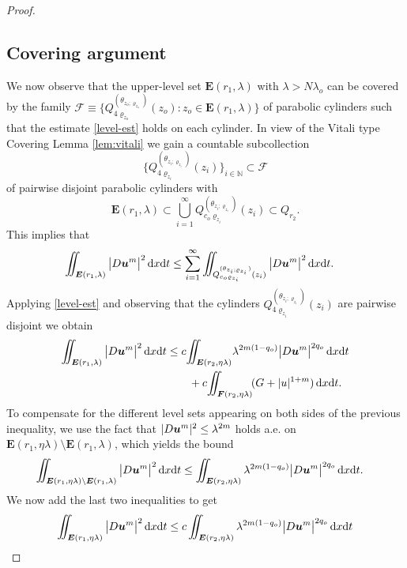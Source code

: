 \documentclass[a4paper, 10pt, american]{amsart}
\numberwithin{theorem}{section}
\numberwithin{equation}{section}
\def\N{\mathbb{N}}
\newcommand{\dxdt}{\,\mathrm{d}x\mathrm{d}t}
\renewcommand{\rho}{\varrho}
\newcommand{\power}[2]{\bm{#1^{\mbox{\unboldmath{\scriptsize$#2$}}}}}
\begin{document}
\begin{proof}
\subsection{Covering argument}
We now observe that the upper-level set $\boldsymbol E(r_1,\lambda)$
with $\lambda>N\lambda_o$ can be covered by the family
$\mathcal
F\equiv\big\{Q_{4\rho_{z_o}}^{(\theta_{z_o;\rho_{z_o}})}(z_o):
z_o\in\boldsymbol E(r_1,\lambda) \big\}$ of parabolic cylinders such that
the estimate \eqref{level-est} holds on each cylinder. In view of the Vitali type Covering Lemma \ref{lem:vitali} we gain a countable subcollection
$$
	\Big\{Q_{4\rho_{z_i}}^{(\theta_{z_i;\rho_{z_i}})}(z_i)\Big\}_{i\in\N}
	\subset \mathcal F
$$
of pairwise disjoint parabolic cylinders with  
$$
	\boldsymbol E(r_1,\lambda)
	\subset 
	\bigcup_{i=1}^\infty Q_{c_o\rho_{z_i}}^{(\theta_{z_i;\rho_{z_i}})}(z_i)
	\subset
	Q_{r_2}.
$$
This implies that
\begin{align}
	\iint_{\boldsymbol E(r_1,\lambda)} 
	\big|D\power{u}{m}\big|^2 \dxdt
	&\le
	\sum_{i=1}^\infty
	\iint_{Q_{c_o\rho_{z_i}}^{(\theta_{z_i;\rho_{z_i}})}(z_i)} 
	\big|D\power{u}{m}\big|^2 \dxdt. \nonumber
\end{align}
Applying \eqref{level-est} and observing that the cylinders $Q_{4\rho_{z_i}}^{(\theta_{z_i;\rho_{z_i}})}(z_i)$ are pairwise disjoint we obtain
\begin{align*}
	\iint_{\boldsymbol E(r_1,\lambda)} 
	\big|D\power{u}{m}\big|^2 \dxdt
	&\le
	c\!\iint_{\boldsymbol E(r_2,\eta\lambda)} \!
	\lambda^{2m(1-q_o)}\big|D\power{u}{m}\big|^{2q_o} \dxdt \\\nonumber
	&\qquad+
	c\!\iint_{\boldsymbol F(r_2,\eta\lambda)} \!
	(G+|u|^{1+m}) \dxdt.
\end{align*}
To compensate for the different level sets appearing on both sides of the previous inequality, 
we use the fact that $|D\power um|^2\le\lambda^{2m}$ holds a.e. on
$\boldsymbol E(r_1,\eta\lambda)\setminus \boldsymbol E(r_1,\lambda)$,
which yields the bound
\begin{align*}
	\iint_{\boldsymbol E(r_1,\eta\lambda)\setminus \boldsymbol E(r_1,\lambda)} 
	\big|D\power{u}{m}\big|^2 \dxdt
	&\le
	\iint_{\boldsymbol E(r_2,\eta\lambda)} 
	\lambda^{2m(1-q_o)}\big|D\power{u}{m}\big|^{2q_o} \dxdt.
\end{align*}
We now add the last two inequalities to get
\begin{align*}
	\iint_{\boldsymbol E(r_1,\eta\lambda)} 
	\big|D\power{u}{m}\big|^2 \dxdt 
	&\le
	c\iint_{\boldsymbol E(r_2,\eta\lambda)} 
	\lambda^{2m(1-q_o)}\big|D\power{u}{m}\big|^{2q_o} \dxdt\\

\end{align*}
\end{proof}
\end{document}

